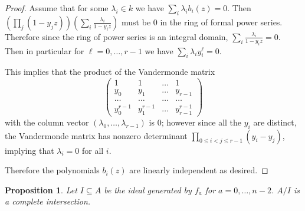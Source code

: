 \documentclass{article}
\numberwithin{equation}{section}
\newtheorem{proposition}[equation]{Proposition}
\begin{document}
\begin{proof} 

Assume that for some $\lambda_i \in k$ we have $\sum_i \lambda_ib_i(z)=0$.  Then $\left(\prod_j (1-y_jz)\right)\left(\sum_i \frac{\lambda_i}{1-y_iz}\right)$ must be $0$ in the ring of formal power series. Therefore since the ring of power series is an integral domain, $\sum_i \frac{\lambda_i}{1-y_iz}=0$. Then in particular for $\ell=0,\dots,r-1$ we have $\sum_i \lambda_iy_i^\ell=0$.

This implies that the product of the Vandermonde matrix $$\left(\begin{smallmatrix} 1& 1& \dots& 1\\y_0&y_1&\dots&y_{r-1}\\\dots&\dots&\dots&\dots\\y_0^{r-1}&y_1^{r-1}&\dots&y_{r-1}^{r-1}\end{smallmatrix}\right)$$ with the column vector $(\lambda_0,\dots,\lambda_{r-1})$ is $0$; however since all the $y_i$ are distinct, the Vandermonde matrix has nonzero determinant $\prod_{0 \le i < j \le r-1} (y_i-y_j)$, implying that $\lambda_i=0$ for all $i$. 

Therefore the polynomials $b_i(z)$ are linearly independent as desired.

\end{proof}


\begin{proposition}\label{prop:ci} Let $I \subseteq A$ be the ideal generated by $f_a$ for $a=0,\dots,n-2$. $A/I$ is a complete intersection. 
\end{proposition}
\end{document}
